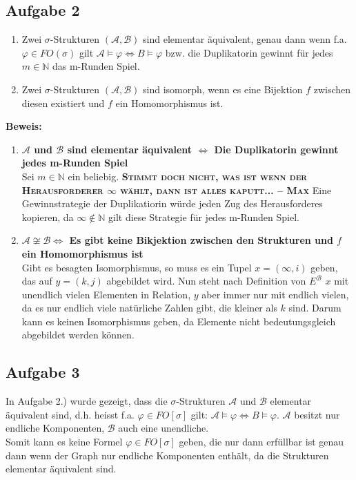 \documentclass[a4paper,10pt]{article}
\newcommand{\N}{\mathbb{N}}
\begin{document}
\subsection*{Aufgabe 2}
\begin{enumerate}
	\item 	Zwei $\sigma$-Strukturen $(\mathcal{A},\mathcal{B})$ sind elementar äquivalent, genau dann wenn f.a. $\varphi \in FO(\sigma)$ gilt $\mathcal{A} \vDash \varphi \Leftrightarrow B \vDash \varphi$ bzw. die Duplikatorin gewinnt für jedes $m \in \N$ das m-Runden Spiel. 
	\item  	Zwei $\sigma$-Strukturen $(\mathcal{A},\mathcal{B})$ sind isomorph, wenn es eine Bijektion $f$ zwischen diesen existiert und $f$ ein Homomorphismus ist.
\end{enumerate}
\textbf{Beweis:}
\begin{enumerate}
	\item \textbf{$\mathcal{A}$ und $\mathcal{B}$ sind elementar äquivalent $\Leftrightarrow$ Die Duplikatorin gewinnt jedes m-Runden Spiel} \\
	Sei $m \in \N$ ein beliebig. \textbf\textsc{{Stimmt doch nicht, was ist wenn der Herausforderer $\infty$ wählt, dann ist alles kaputt... -- Max}}
Eine Gewinnstrategie der Duplikatiorin würde jeden Zug des Herausforderes kopieren, da $\infty \not \in \N$ gilt diese Strategie für jedes m-Runden Spiel. 
	\item \textbf{$\mathcal{A} \not \cong \mathcal{B} \Leftrightarrow$ Es gibt keine Bikjektion zwischen den Strukturen und $f$ ein Homomorphismus ist} \\
	Gibt es besagten Isomorphismus, so muss es ein Tupel $ x = (\infty, i)$ geben, das auf $y = (k,j)$ abgebildet wird. Nun steht nach Definition von $E^{\mathcal{B}}$ $x$ mit unendlich vielen Elementen in Relation, $y$ aber immer nur mit endlich vielen, da es nur endlich viele natürliche Zahlen gibt, die kleiner als $k$ sind. Darum kann es keinen Isomorphismus geben, da Elemente nicht bedeutungsgleich abgebildet werden können.
\end{enumerate}





\subsection*{Aufgabe 3}
In Aufgabe 2.) wurde gezeigt, dass die $\sigma$-Strukturen $\mathcal{A}$ und $\mathcal{B}$ elementar äquivalent sind, d.h. heisst f.a. $\varphi \in FO[\sigma]$ gilt: $\mathcal{A} \vDash \varphi \Leftrightarrow B \vDash \varphi$. $\mathcal{A}$ besitzt nur endliche Komponenten, $\mathcal{B}$ auch eine unendliche. \\Somit kann es keine Formel $\varphi \in FO[\sigma]$ geben, die nur dann erfüllbar ist genau dann wenn der Graph nur endliche Komponenten enthält, da die Strukturen elementar äquivalent sind.
\end{document}
